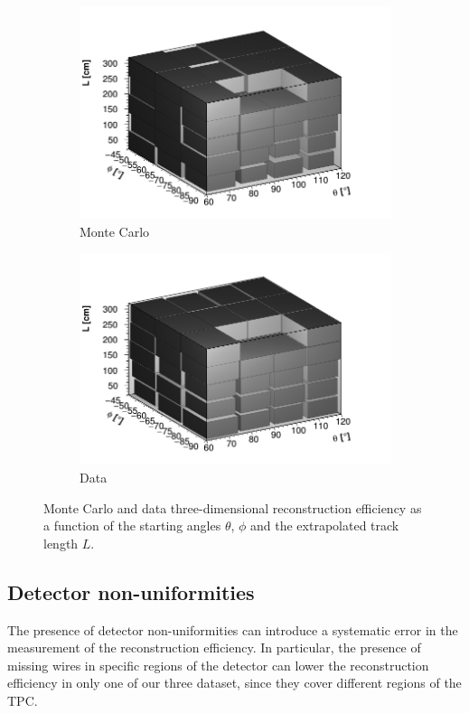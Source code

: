 \documentclass[a4paper]{scrartcl}
\begin{document}
\begin{figure}[htbp]
  \begin{subfigure}{0.52\textwidth}
    \includegraphics[width=\linewidth]{figures/3d_mc.png}
    \caption{Monte Carlo} \label{fig:3d_mc}
  \end{subfigure}
  \begin{subfigure}{0.52\textwidth}
    \includegraphics[width=\linewidth]{figures/3d_data.png}
    \caption{Data} \label{fig:3d_data}
  \end{subfigure}
  \caption{Monte Carlo and data three-dimensional reconstruction efficiency as a function of the starting angles $\theta$, $\phi$ and the extrapolated track length $L$.}
\end{figure}

\subsection{Detector non-uniformities}
The presence of detector non-uniformities can introduce a systematic error in the measurement of the reconstruction efficiency. In particular, the presence of missing wires in specific regions of the detector can lower the reconstruction efficiency in only one of our three dataset, since they cover different regions of the TPC.
\end{document}
